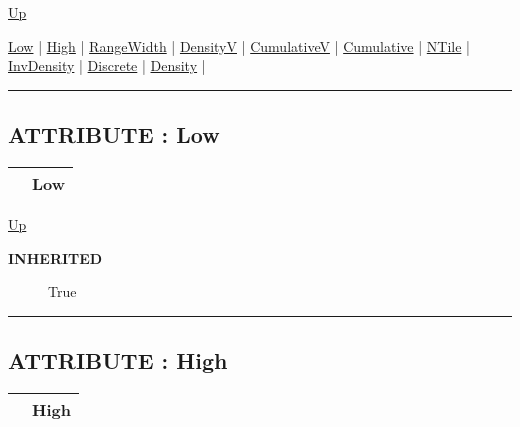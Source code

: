 \hyperlink{ecldoc:linearregression.ols}{Up}

\par


\hyperlink{ecldoc:linearregression.ols.distributionbase.low}{Low}  |
\hyperlink{ecldoc:linearregression.ols.distributionbase.high}{High}  |
\hyperlink{ecldoc:linearregression.ols.distributionbase.rangewidth}{RangeWidth}  |
\hyperlink{ecldoc:linearregression.ols.distributionbase.densityv}{DensityV}  |
\hyperlink{ecldoc:linearregression.ols.distributionbase.cumulativev}{CumulativeV}  |
\hyperlink{ecldoc:linearregression.ols.distributionbase.cumulative}{Cumulative}  |
\hyperlink{ecldoc:linearregression.ols.distributionbase.ntile}{NTile}  |
\hyperlink{ecldoc:linearregression.ols.distributionbase.invdensity}{InvDensity}  |
\hyperlink{ecldoc:linearregression.ols.distributionbase.discrete}{Discrete}  |
\hyperlink{ecldoc:linearregression.ols.normaldistribution.density}{Density}  |

\rule{\textwidth}{0.4pt}

\subsection*{ATTRIBUTE : Low}
\hypertarget{ecldoc:linearregression.ols.distributionbase.low}{}

{\renewcommand{\arraystretch}{1.5}
\begin{tabularx}{\textwidth}{|>{\raggedright\arraybackslash}l|X|}
\hline
\hspace{0pt} & Low \\
\hline
\end{tabularx}
}

\hyperlink{ecldoc:linearregression.ols.normaldistribution}{Up}

\par

\par
\begin{description}
\item [\textbf{INHERITED}] True
\end{description}

\rule{\textwidth}{0.4pt}
\subsection*{ATTRIBUTE : High}
\hypertarget{ecldoc:linearregression.ols.distributionbase.high}{}

{\renewcommand{\arraystretch}{1.5}
\begin{tabularx}{\textwidth}{|>{\raggedright\arraybackslash}l|X|}
\hline
\hspace{0pt} & High \\
\hline
\end{tabularx}
}

